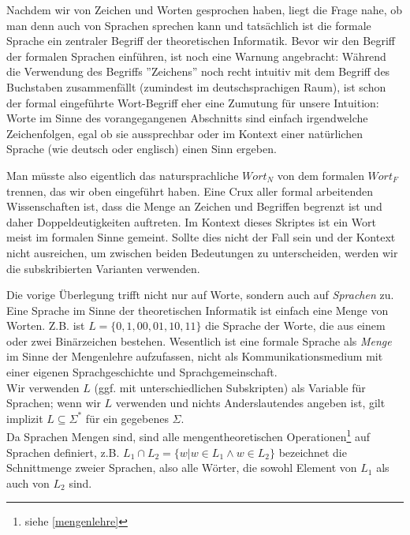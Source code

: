 Nachdem wir von Zeichen und Worten gesprochen haben, liegt die Frage nahe,
ob man denn auch von Sprachen sprechen kann und tatsächlich ist die formale Sprache 
ein zentraler Begriff der theoretischen Informatik.
Bevor wir den Begriff der formalen Sprachen einführen, ist noch eine Warnung angebracht:
Während die Verwendung des Begriffs ''Zeichens''
noch recht intuitiv mit dem Begriff des Buchstaben zusammenfällt
(zumindest im deutschsprachigen Raum),
ist schon der formal eingeführte Wort-Begriff eher eine Zumutung für unsere Intuition:
Worte im Sinne des vorangegangenen Abschnitts sind einfach irgendwelche Zeichenfolgen,
egal ob sie aussprechbar oder im Kontext einer natürlichen Sprache
(wie deutsch oder englisch) einen Sinn ergeben.

Man müsste also eigentlich das natursprachliche $Wort_N$ von dem formalen $Wort_F$ trennen,
das wir oben eingeführt haben.
Eine Crux aller formal arbeitenden Wissenschaften ist,
dass die Menge an Zeichen und Begriffen begrenzt ist und daher Doppeldeutigkeiten auftreten.
Im Kontext dieses Skriptes ist ein Wort meist im formalen Sinne gemeint.
Sollte dies nicht der Fall sein und der Kontext nicht ausreichen,
um zwischen beiden Bedeutungen zu unterscheiden,
werden wir die subskribierten Varianten verwenden.

Die vorige Überlegung trifft nicht nur auf Worte, sondern auch auf \emph{Sprachen} zu.
Eine Sprache im Sinne der theoretischen Informatik ist einfach eine Menge von Worten.
Z.B. ist $L = \{0, 1, 00, 01, 10, 11 \}$ die Sprache der Worte,
die aus einem oder zwei Binärzeichen bestehen.
Wesentlich ist eine formale Sprache als \emph{Menge} im Sinne der Mengenlehre aufzufassen, 
nicht als Kommunikationsmedium mit einer eigenen Sprachgeschichte und Sprachgemeinschaft.\\

\noindent
Wir verwenden $L$ (ggf. mit unterschiedlichen Subskripten) als Variable für Sprachen;
wenn wir $L$ verwenden und nichts Anderslautendes angeben ist,
gilt implizit $L \subseteq \Sigma^*$ für ein gegebenes $\Sigma$.\\

\noindent
Da Sprachen Mengen sind,
sind alle mengentheoretischen Operationen\footnote{siehe \autoref{mengenlehre}}
auf Sprachen definiert,
z.B. $L_1 \cap L_2 = \{w | w \in L_1 \wedge w \in L_2\}$
bezeichnet die Schnittmenge zweier Sprachen, also alle Wörter,
die sowohl Element von $L_1$ als auch von $L_2$ sind.

